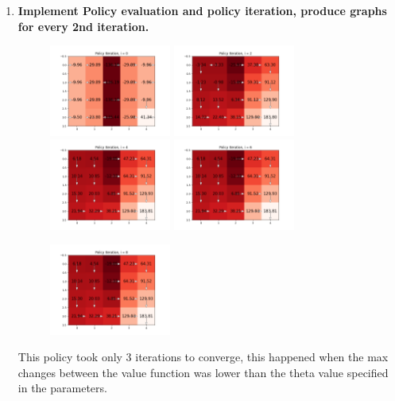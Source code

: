 \documentclass[submit]{harvardml}
\begin{document}
\begin{enumerate}
    \item \textbf{Implement Policy evaluation and policy iteration, produce graphs for every 2nd iteration.}
    
    \begin{figure}[H]
        \centering
        \includegraphics[width=4cm]{hw6/plots/Policy_0.png}
        \includegraphics[width=4cm]{hw6/plots/Policy_2.png}
        \includegraphics[width=4cm]{hw6/plots/Policy_4.png}
        \includegraphics[width=4cm]{hw6/plots/Policy_6.png}
    \end{figure}
    \begin{figure}[H]
        \includegraphics[width=4cm]{hw6/plots/Policy_8.png}
        \centering
    \end{figure}
    
    This policy took only 3 iterations to converge, this happened when the max changes between the value  function was lower than the theta value specified in the parameters.
    

\end{enumerate}
\end{document}
